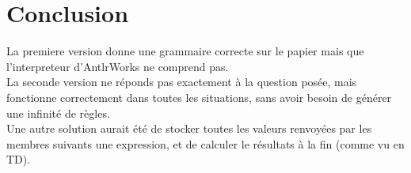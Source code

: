 \documentclass[11pt,a4paper]{article}
\begin{document}
\part{Conclusion}
La premiere version donne une grammaire correcte sur le papier mais que l'interpreteur d'AntlrWorks ne comprend pas.\\
La seconde version ne réponds pas exactement à la question posée, mais fonctionne correctement dans toutes les situations, sans avoir besoin de générer une infinité de règles.\\
Une autre solution aurait été de stocker toutes les valeurs renvoyées par les membres suivants une expression, et de calculer le résultats à la fin (comme vu en TD).
\end{document}

